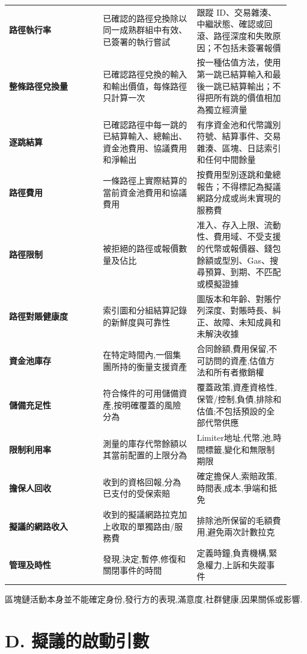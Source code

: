\documentclass[11pt]{article}
\begin{document}
\begin{longtable}{P{0.31\linewidth} P{0.31\linewidth} P{0.31\linewidth}}
\textbf{路徑執行率} & 已確認的路徑兌換除以同一成熟群組中有效、已簽署的執行嘗試 & 跟蹤 ID、交易雜湊、中繼狀態、確認或回滾、路徑深度和失敗原因；不包括未簽署報價 \\
\textbf{整條路徑兌換量} & 已確認路徑兌換的輸入和輸出價值，每條路徑只計算一次 & 按一種估值方法，使用第一跳已結算輸入和最後一跳已結算輸出；不得把所有跳的價值相加為獨立經濟量 \\
\textbf{逐跳結算} & 已確認路徑中每一跳的已結算輸入、總輸出、資金池費用、協議費用和淨輸出 & 有序資金池和代幣識別符號、結算事件、交易雜湊、區塊、日誌索引和任何中間餘量 \\
\textbf{路徑費用} & 一條路徑上實際結算的當前資金池費用和協議費用 & 按費用型別逐跳和彙總報告；不得標記為擬議網路分成或尚未實現的服務費 \\
\textbf{路徑限制} & 被拒絕的路徑或報價數量及佔比 & 准入、存入上限、流動性、費用域、不受支援的代幣或報價器、錢包餘額或型別、Gas、搜尋預算、到期、不匹配或模擬證據 \\
\textbf{路徑對賬健康度} & 索引圖和分組結算記錄的新鮮度與可靠性 & 圖版本和年齡、對賬佇列深度、對賬時長、糾正、故障、未知成員和未解決收據 \\
\textbf{資金池庫存} & 在特定時間內,一個集團所持的衡量支援資產 & 合同餘額,費用保留,不可訪問的資產,估值方法和所有者撤銷權 \\
\textbf{儲備充足性} & 符合條件的可用儲備資產,按明確覆蓋的風險分為 & 覆蓋政策,資產資格性,保管/控制,負債,排除和估值;不包括預設的全部代幣供應 \\
\textbf{限制利用率} & 測量的庫存代幣餘額以其當前配置的上限分為 & Limiter地址,代幣,池,時間標籤,變化和無限制期限 \\
\textbf{擔保人回收} & 收到的資格回報,分為已支付的受保索賠 & 確定擔保人,索賠政策,時間表,成本,爭端和抵免 \\
\textbf{擬議的網路收入} & 收到的擬議網路拉克加上收取的單獨路由/服務費 & 排除池所保留的毛額費用,避免兩次計數拉克 \\
\textbf{管理及時性} & 發現,決定,暫停,修復和關閉事件的時間 & 定義時鐘,負責機構,緊急權力,上訴和失蹤事件 \\
\bottomrule
\end{longtable}

區塊鏈活動本身並不能確定身份,發行方的表現,滿意度,社群健康,因果關係或影響.


\section*{D. 擬議的啟動引數}
\end{document}
